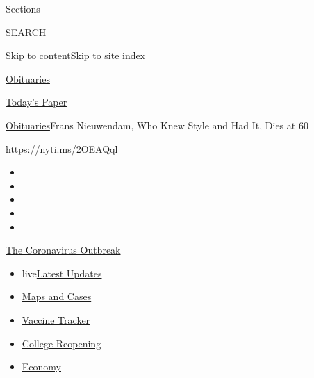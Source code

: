 Sections

SEARCH

\protect\hyperlink{site-content}{Skip to
content}\protect\hyperlink{site-index}{Skip to site index}

\href{https://www.nytimes3xbfgragh.onion/section/obituaries}{Obituaries}

\href{https://myaccount.nytimes3xbfgragh.onion/auth/login?response_type=cookie\&client_id=vi}{}

\href{https://www.nytimes3xbfgragh.onion/section/todayspaper}{Today's
Paper}

\href{/section/obituaries}{Obituaries}\textbar{}Frans Nieuwendam, Who
Knew Style and Had It, Dies at 60

\url{https://nyti.ms/2OEAQql}

\begin{itemize}
\item
\item
\item
\item
\item
\end{itemize}

\href{https://www.nytimes3xbfgragh.onion/news-event/coronavirus?action=click\&pgtype=Article\&state=default\&region=TOP_BANNER\&context=storylines_menu}{The
Coronavirus Outbreak}

\begin{itemize}
\tightlist
\item
  live\href{https://www.nytimes3xbfgragh.onion/2020/08/04/world/coronavirus-covid-19.html?action=click\&pgtype=Article\&state=default\&region=TOP_BANNER\&context=storylines_menu}{Latest
  Updates}
\item
  \href{https://www.nytimes3xbfgragh.onion/interactive/2020/us/coronavirus-us-cases.html?action=click\&pgtype=Article\&state=default\&region=TOP_BANNER\&context=storylines_menu}{Maps
  and Cases}
\item
  \href{https://www.nytimes3xbfgragh.onion/interactive/2020/science/coronavirus-vaccine-tracker.html?action=click\&pgtype=Article\&state=default\&region=TOP_BANNER\&context=storylines_menu}{Vaccine
  Tracker}
\item
  \href{https://www.nytimes3xbfgragh.onion/2020/08/02/us/covid-college-reopening.html?action=click\&pgtype=Article\&state=default\&region=TOP_BANNER\&context=storylines_menu}{College
  Reopening}
\item
  \href{https://www.nytimes3xbfgragh.onion/live/2020/08/03/business/stock-market-today-coronavirus?action=click\&pgtype=Article\&state=default\&region=TOP_BANNER\&context=storylines_menu}{Economy}
\end{itemize}

